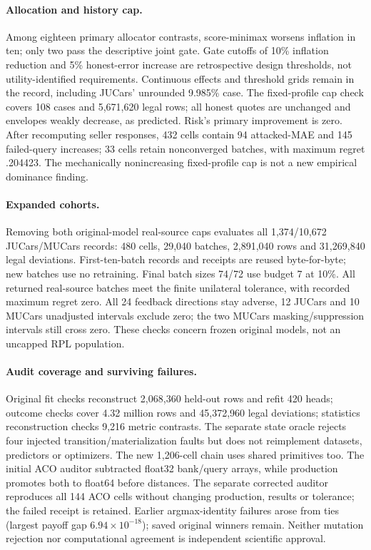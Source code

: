 \documentclass[11pt]{article}
\begin{document}
\paragraph{Allocation and history cap.}
Among eighteen primary allocator contrasts, score-minimax worsens inflation
in ten; only two pass the descriptive joint gate. Gate cutoffs of 10\%
inflation reduction and 5\% honest-error increase are retrospective design
thresholds, not utility-identified requirements. Continuous effects and
threshold grids remain in the record, including JUCars' unrounded 9.985\%
case. The fixed-profile cap check covers 108 cases and 5,671,620 legal rows;
all honest quotes are unchanged and envelopes weakly decrease, as predicted.
Risk's primary improvement is zero. After recomputing seller responses,
432 cells contain 94 attacked-MAE and 145 failed-query increases; 33 cells
retain nonconverged batches, with maximum regret .204423. The mechanically
nonincreasing fixed-profile cap is not a new empirical dominance finding.

\paragraph{Expanded cohorts.}
Removing both original-model real-source caps evaluates all 1,374/10,672
JUCars/MUCars records: 480 cells, 29,040 batches, 2,891,040 rows and
31,269,840 legal deviations. First-ten-batch records and receipts are reused
byte-for-byte; new batches use no retraining. Final batch sizes 74/72 use
budget 7 at 10\%. All returned real-source batches meet the finite unilateral
tolerance, with recorded maximum regret zero. All 24 feedback directions stay
adverse, 12 JUCars and 10 MUCars unadjusted intervals exclude zero; the two
MUCars masking/suppression intervals still cross zero. These checks concern
frozen original models, not an uncapped RPL population.

\paragraph{Audit coverage and surviving failures.}
Original fit checks reconstruct 2,068,360 held-out rows and refit 420 heads;
outcome checks cover 4.32 million rows and 45,372,960 legal deviations;
statistics reconstruction checks 9,216 metric contrasts. The separate state
oracle rejects four injected transition/materialization faults but does not
reimplement datasets, predictors or optimizers. The new 1,206-cell chain uses
shared primitives too. The initial ACO auditor subtracted float32 bank/query
arrays, while production promotes both to float64 before distances. The
separate corrected auditor reproduces all 144 ACO cells without changing
production, results or tolerance; the failed receipt is retained. Earlier
argmax-identity failures arose from ties (largest payoff gap
$6.94\times10^{-18}$); saved original winners remain. Neither mutation
rejection nor computational agreement is independent scientific approval.
\end{document}
